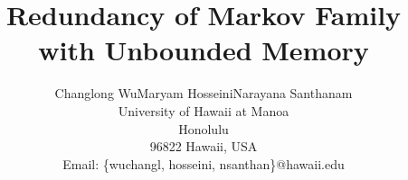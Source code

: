 \documentclass[conference,a4paper]{article}
\begin{document}
\title{Redundancy of Markov Family with Unbounded Memory} 


\author{%
  Changlong Wu\qquad Maryam Hosseini\qquad Narayana Santhanam\\
  University of Hawaii at Manoa\\
                    Honolulu\\ 
                    96822 Hawaii, USA\\
                    Email: \{wuchangl, hosseini, nsanthan\}@hawaii.edu
}
\maketitle



\end{document}
